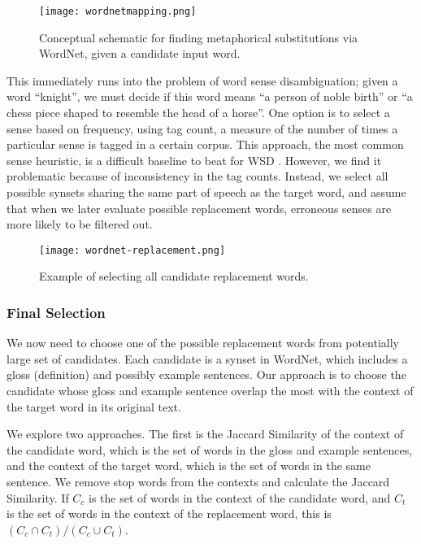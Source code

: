 \documentclass[12pt]{article}
\begin{document}
\begin{figure}[h]
	\centering
	\texttt{[image: wordnetmapping.png]}
	\caption{Conceptual schematic for finding metaphorical substitutions via WordNet, given a candidate input word.}
	\label{fig:wnmapping}
\end{figure}

This immediately runs into the problem of word sense disambiguation; given a word ``knight'', we must decide if this word means ``a person of noble birth'' or ``a chess piece shaped to resemble the head of a horse''. One option is to select a sense based on frequency, using tag count, a measure of the number of times a particular sense is tagged in a certain corpus. This approach, the most common sense heuristic, is a difficult baseline to beat for WSD \cite{mccarthy}. However, we find it problematic because of inconsistency in the tag counts. Instead, we select all possible synsets sharing the same part of speech as the target word, and assume that when we later evaluate possible replacement words, erroneous senses are more likely to be filtered out.

\begin{figure}[h]
	\centering
	\texttt{[image: wordnet-replacement.png]}
	\caption{Example of selecting all candidate replacement words.}
	\label{fig:wnmapexample}
\end{figure}

\subsubsection{Final Selection}

We now need to choose one of the possible replacement words from potentially large set of candidates. Each candidate is a synset in WordNet, which includes a gloss (definition) and possibly example sentences. Our approach is to choose the candidate whose gloss and example sentence overlap the most with the context of the target word in its original text.

We explore two approaches. The first is the Jaccard Similarity of the context of the candidate word, which is the set of words in the gloss and example sentences, and the context of the target word, which is the set of words in the same sentence. We remove stop words from the contexts and calculate the Jaccard Similarity. If $C_c$ is the set of words in the context of the candidate word, and $C_t$ is the set of words in the context of the replacement word, this is $(C_c \cap C_t) / (C_c \cup C_t)$.
\end{document}
